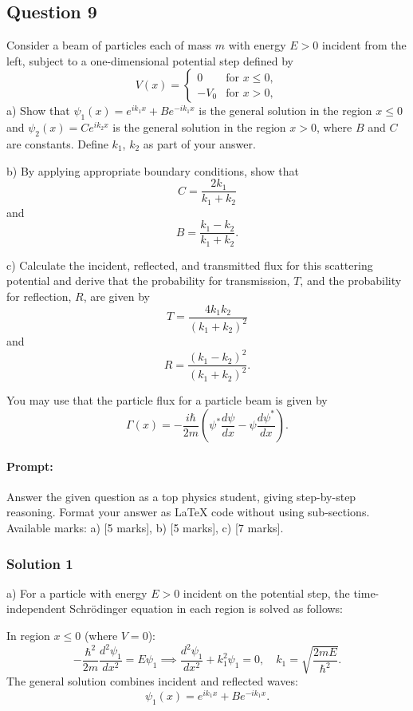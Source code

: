 \documentclass{article}
\begin{document}
\subsection{Question 9}
Consider a beam of particles each of mass $m$ with energy $E > 0$ incident from the left, subject to a one-dimensional potential step defined by
\[
V(x) =
\begin{cases}
0 & \text{for } x \leq 0, \\
-V_0 & \text{for } x > 0,
\end{cases}
\]
a) Show that $\psi_1(x) = e^{ik_1x} + Be^{-ik_1x}$ is the general solution in the region $x \leq 0$ and $\psi_2(x) = Ce^{ik_2x}$ is the general solution in the region $x > 0$, where $B$ and $C$ are constants. Define $k_1$, $k_2$ as part of your answer.

b) By applying appropriate boundary conditions, show that
\[
C = \frac{2k_1}{k_1 + k_2}
\]
and
\[
B = \frac{k_1 - k_2}{k_1 + k_2}.
\]

c) Calculate the incident, reflected, and transmitted flux for this scattering potential and derive that the probability for transmission, $T$, and the probability for reflection, $R$, are given by
\[
T = \frac{4k_1k_2}{(k_1 + k_2)^2}
\]
and
\[
R = \frac{(k_1 - k_2)^2}{(k_1 + k_2)^2}.
\]

You may use that the particle flux for a particle beam is given by
\[
\Gamma(x) = -\frac{i\hbar}{2m} \left( \psi^* \frac{d\psi}{dx} - \psi \frac{d\psi^*}{dx} \right).
\]


\paragraph{Prompt: \\} 
Answer the given question as a top physics student, giving step-by-step reasoning. Format your answer as LaTeX code without using sub-sections. Available marks: a) [5 marks], b) [5 marks], c) [7 marks].


\subsubsection{Solution 1}
a) For a particle with energy \( E > 0 \) incident on the potential step, the time-independent Schrödinger equation in each region is solved as follows:

In region \( x \leq 0 \) (where \( V = 0 \)):
\[
-\frac{\hbar^2}{2m} \frac{d^2 \psi_1}{dx^2} = E \psi_1 \implies \frac{d^2 \psi_1}{dx^2} + k_1^2 \psi_1 = 0, \quad k_1 = \sqrt{\frac{2mE}{\hbar^2}}.
\]
The general solution combines incident and reflected waves:
\[
\psi_1(x) = e^{ik_1x} + B e^{-ik_1x}.
\]
\end{document}
